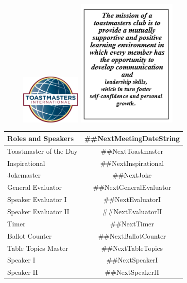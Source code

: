\documentclass{article}
\newcommand{\nextMeetingDateString}{##NextMeetingDateString}
\newcommand{\nextToastmaster}{##NextToastmaster}
\newcommand{\nextTableTopics}{##NextTableTopics}
\newcommand{\nextGeneralEvaluator}{##NextGeneralEvaluator}
\newcommand{\nextEvaluatorI}{##NextEvaluatorI}
\newcommand{\nextEvaluatorII}{##NextEvaluatorII}
\newcommand{\nextSpeakerI}{##NextSpeakerI}
\newcommand{\nextSpeakerII}{##NextSpeakerII}
\newcommand{\nextTimer}{##NextTimer}
\newcommand{\nextInspirational}{##NextInspirational}
\newcommand{\nextBallotCounter}{##NextBallotCounter}
\newcommand{\nextJoke}{##NextJoke}
\begin{document}
  \begin{figure}[b]
    \includegraphics[width=3cm]{logo}
    \includegraphics[width=5cm]{mission}
  \end{figure}
  \begin{tabular}{ |l|c| }
    \hline
    Roles and Speakers & \nextMeetingDateString{} \\
    \hline
    Toastmaster of the Day & \nextToastmaster{} \\
    \hline
    Inspirational & \nextInspirational{} \\
    \hline
    Jokemaster & \nextJoke{} \\
    \hline
    General Evaluator & \nextGeneralEvaluator{} \\
    \hline
    Speaker Evaluator I & \nextEvaluatorI{} \\
    \hline
    Speaker Evaluator II & \nextEvaluatorII{} \\
    \hline
    Timer & \nextTimer{} \\
    \hline
    Ballot Counter & \nextBallotCounter{} \\
    \hline
    Table Topics Master & \nextTableTopics{} \\
    \hline\hline
    Speaker I & \nextSpeakerI{} \\
    \hline
    Speaker II & \nextSpeakerII{} \\
    \hline
  \end{tabular}
\end{document}
